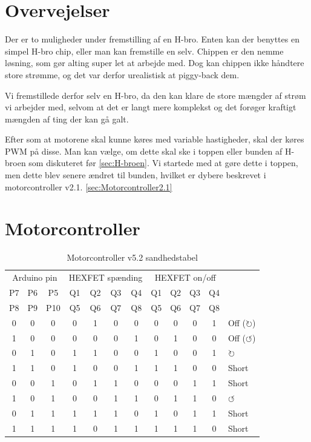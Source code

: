 \documentclass[a4paper,oneside,article,danish,table]{memoir}
\begin{document}
\section{Overvejelser}
Der er to muligheder under fremstilling af en H-bro. Enten kan der benyttes en simpel H-bro chip, eller man kan fremstille en selv. Chippen er den nemme løsning, som gør alting super let at arbejde med. Dog kan chippen ikke håndtere store strømme, og det var derfor urealistisk at piggy-back dem.

Vi fremstillede derfor selv en H-bro, da den kan klare de store mængder af strøm vi arbejder med, selvom at det er langt mere komplekst og det forøger kraftigt mængden af ting der kan gå galt.

Efter som at motorene skal kunne køres med variable hastigheder, skal der køres PWM på disse. Man kan vælge, om dette skal ske i toppen eller bunden af H-broen som diskuteret før \ref{sec:H-broen}. Vi startede med at gøre dette i toppen, men dette blev senere ændret til bunden, hvilket er dybere beskrevet i motorcontroller v2.1. \ref{sec:Motorcontroller2.1}
\section{Motorcontroller}

\begin{table}[htbp]
  \caption{Motorcontroller v5.2 sandhedstabel}
  \centering
  \begin{tabular}{ccc|cccc|ccccl}
    \toprule
    \multicolumn{3}{c}{Arduino pin}&\multicolumn{4}{c}{HEXFET spænding}&\multicolumn{4}{c}{HEXFET on/off}\\
    P7&P6&P5 &Q1&Q2&Q3&Q4 &Q1&Q2&Q3&Q4\\
    P8&P9&P10 &Q5&Q6&Q7&Q8 &Q5&Q6&Q7&Q8\\
    \midrule
    0&0&0 &0&1&0&0 &0&0&0&1 & Off ($\circlearrowright$)\\
    1&0&0 &0&0&0&1 &0&1&0&0 & Off ($\circlearrowleft$)\\
    0&1&0 &1&1&0&0 &1&0&0&1 & $\circlearrowright$\\
    1&1&0 &1&0&0&1 &1&1&0&0 & Short\\
    0&0&1 &0&1&1&0 &0&0&1&1 & Short\\
    1&0&1 &0&0&1&1 &0&1&1&0 & $\circlearrowleft$\\
    0&1&1 &1&1&1&0 &1&0&1&1 & Short\\
    1&1&1 &1&0&1&1 &1&1&1&0 & Short\\
    \bottomrule
  \end{tabular}
  \label{tab:sandhed}
\end{table}
\end{document}
